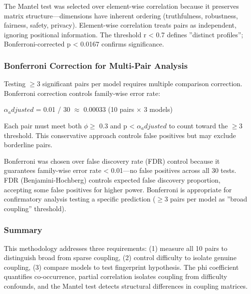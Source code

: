 The Mantel test was selected over element-wise correlation because it preserves matrix structure---dimensions have inherent ordering (truthfulness, robustness, fairness, safety, privacy). Element-wise correlation treats pairs as independent, ignoring positional information. The threshold r < 0.7 defines ''distinct profiles''; Bonferroni-corrected p < 0.0167 confirms significance.

\subsubsection{Bonferroni Correction for Multi-Pair Analysis}

Testing $\geq 3$ significant pairs per model requires multiple comparison correction. Bonferroni correction controls family-wise error rate:

$\alpha _adjusted$ = 0.01 / 30 $\approx$ 0.00033 (10 pairs $\times$ 3 models)

Each pair must meet both $\phi \geq$ 0.3 and p < $\alpha _adjusted$ to count toward the $\geq 3$ threshold. This conservative approach controls false positives but may exclude borderline pairs.

Bonferroni was chosen over false discovery rate (FDR) control because it guarantees family-wise error rate < 0.01---no false positives across all 30 tests. FDR (Benjamini-Hochberg) controls expected false discovery proportion, accepting some false positives for higher power. Bonferroni is appropriate for confirmatory analysis testing a specific prediction ($\geq 3$ pairs per model as ''broad coupling'' threshold).

\subsubsection{Summary}

This methodology addresses three requirements: (1) measure all 10 pairs to distinguish broad from sparse coupling, (2) control difficulty to isolate genuine coupling, (3) compare models to test fingerprint hypothesis. The phi coefficient quantifies co-occurrence, partial correlation isolates coupling from difficulty confounds, and the Mantel test detects structural differences in coupling matrices.
